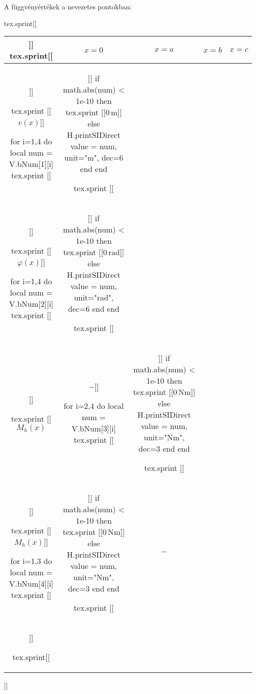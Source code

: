 A függvényértékek a nevezetes pontokban:
\begin{center}
\sifix{}
\def\arraystretch{1.25}
\begin{luacode*}
  tex.sprint[[\begin{tabular}{c|cccc|}]]
  tex.sprint[[& $x = 0$ & $x = a$ & $x = b$ & $x = c$ \\\hline]]

  tex.sprint [[$v(x)$]]

  for i=1,4 do
    local num = V.bNum[1][i]
    tex.sprint [[&]]
    if math.abs(num) < 1e-10 then
      tex.sprint [[$0\,\mathrm{m}$]]
    else
      H.printSIDirect { value = num, unit="m", dec=6 }
    end
  end

  tex.sprint [[\\]]

  tex.sprint [[$\varphi(x)$]]

  for i=1,4 do
    local num = V.bNum[2][i]
    tex.sprint [[&]]
    if math.abs(num) < 1e-10 then
      tex.sprint [[$0\,\mathrm{rad}$]]
    else
      H.printSIDirect { value = num, unit="rad", dec=6 }
    end
  end

  tex.sprint [[\\]]

  tex.sprint [[$M_h(x)$ & $-$]]

  for i=2,4 do
    local num = V.bNum[3][i]
    tex.sprint [[&]]
    if math.abs(num) < 1e-10 then
      tex.sprint [[$0\,\mathrm{Nm}$]]
    else
      H.printSIDirect { value = num, unit="Nm", dec=3 }
    end
  end

  tex.sprint [[\\]]

  tex.sprint [[$M_h(x)$]]

  for i=1,3 do
    local num = V.bNum[4][i]
    tex.sprint [[&]]
    if math.abs(num) < 1e-10 then
      tex.sprint [[$0\,\mathrm{Nm}$]]
    else
      H.printSIDirect { value = num, unit="Nm", dec=3 }
    end
  end

  tex.sprint [[&$-$\\\hline]]

  tex.sprint[[\end{tabular}]]
\end{luacode*}
\end{center}
